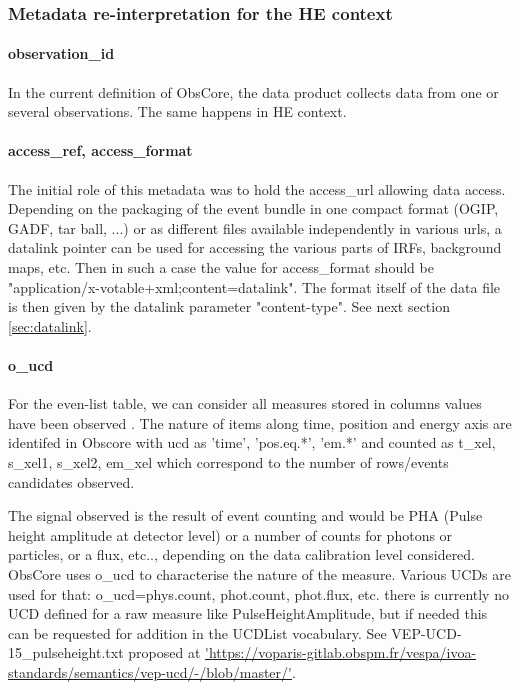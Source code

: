 \documentclass[11pt,a4paper]{ivoa}
\begin{document}
{\subsubsection{Metadata re-interpretation for the HE context}

\paragraph{observation\_id}
In the current definition of ObsCore, the data product collects data from one or several observations. The same happens in HE context.

\paragraph{access\_ref, access\_format}
The initial role of this metadata was to hold the access\_url allowing data access.
Depending on the packaging of the event bundle in one compact format (OGIP, GADF, tar ball, ...)
or as different files available independently in various urls, a datalink pointer can be used for accessing the various parts of IRFs, background maps, etc.
Then in such a case the value for access\_format should be "application/x-votable+xml;content=datalink". The format itself of the data file is then given by the datalink parameter "content-type".
See next section \ref{sec:datalink}.

\paragraph{o\_ucd}
For the even-list table, we can consider all measures stored in columns values have been observed .
The nature of items along time, position and energy axis are identifed in Obscore with ucd as 'time', 'pos.eq.*', 'em.*'
and counted as t\_xel, s\_xel1, s\_xel2, em\_xel which correspond to the number of rows/events candidates observed.

The signal observed is the result of event counting and would be PHA (Pulse height amplitude at detector level) or a number of counts for photons or particles, or a flux, etc.., depending on the data calibration level considered.
ObsCore uses o\_ucd to characterise the nature of the measure.
Various UCDs are used for that: o\_ucd=phys.count, phot.count, phot.flux, etc. there is currently no UCD defined for a raw measure like PulseHeightAmplitude, but if needed this can be requested for addition in the UCDList vocabulary. See VEP-UCD-15\_pulseheight.txt proposed at \url{'https://voparis-gitlab.obspm.fr/vespa/ivoa-standards/semantics/vep-ucd/-/blob/master/'}.

}
\end{document}
